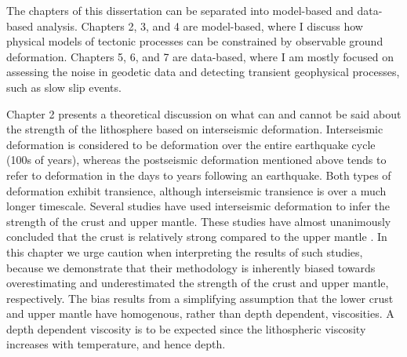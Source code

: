 The chapters of this dissertation can be separated into model-based and data-based analysis. Chapters 2, 3, and 4 are model-based, where I discuss how physical models of tectonic processes can be constrained by observable ground deformation. Chapters 5, 6, and 7 are data-based, where I am mostly focused on assessing the noise in geodetic data and detecting transient geophysical processes, such as slow slip events.    

Chapter 2 presents a theoretical discussion on what can and cannot be said about the strength of the lithosphere based on interseismic deformation. Interseismic deformation is considered to be deformation over the entire earthquake cycle (100s of years), whereas the postseismic deformation mentioned above tends to refer to deformation in the days to years following an earthquake. Both types of deformation exhibit transience, although interseismic transience is over a much longer timescale. Several studies have used interseismic deformation to infer the strength of the crust and upper mantle. These studies have almost unanimously concluded that the crust is relatively strong compared to the upper mantle \citep{Thatcher2008}. In this chapter we urge caution when interpreting the results of such studies, because we demonstrate that their methodology is inherently biased towards overestimating and underestimated the strength of the crust and upper mantle, respectively. The bias results from a simplifying assumption that the lower crust and upper mantle have homogenous, rather than depth dependent, viscosities. A depth dependent viscosity is to be expected since the lithospheric viscosity increases with temperature, and hence depth. 

